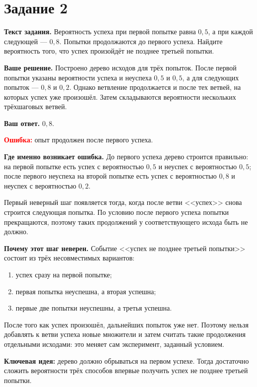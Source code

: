 \documentclass[12pt,a4paper]{article}
\begin{document}
\newpage
{}\label{task:2}
\section*{Задание 2}

\textbf{Текст задания.}
Вероятность успеха при первой попытке равна $0{,}5$, а при каждой следующей --- $0{,}8$. Попытки продолжаются до первого успеха. Найдите вероятность того, что успех произойдёт не позднее третьей попытки.

\textbf{Ваше решение.}
Построено дерево исходов для трёх попыток. После первой попытки указаны вероятности успеха и неуспеха $0{,}5$ и $0{,}5$, а для следующих попыток --- $0{,}8$ и $0{,}2$. Однако ветвление продолжается и после тех ветвей, на которых успех уже произошёл. Затем складываются вероятности нескольких трёхшаговых ветвей.

\textbf{Ваш ответ.} $0{,}8$.

\textcolor{red}{\textbf{Ошибка:}} опыт продолжен после первого успеха.

\textbf{Где именно возникает ошибка.}
До первого успеха дерево строится правильно: на первой попытке есть успех с вероятностью $0{,}5$ и неуспех с вероятностью $0{,}5$; после первого неуспеха на второй попытке есть успех с вероятностью $0{,}8$ и неуспех с вероятностью $0{,}2$.

Первый неверный шаг появляется тогда, когда после ветви <<успех>> снова строится следующая попытка. По условию после первого успеха попытки прекращаются, поэтому таких продолжений у соответствующего исхода быть не должно.

\textbf{Почему этот шаг неверен.}
Событие <<успех не позднее третьей попытки>> состоит из трёх несовместимых вариантов:
\begin{enumerate}
  \item успех сразу на первой попытке;
  \item первая попытка неуспешна, а вторая успешна;
  \item первые две попытки неуспешны, а третья успешна.
\end{enumerate}
После того как успех произошёл, дальнейших попыток уже нет. Поэтому нельзя добавлять к ветви успеха новые множители и затем считать такие продолжения отдельными исходами: это меняет сам эксперимент, заданный условием.

\textcolor{blue!60!black}{\textbf{Ключевая идея:}} дерево должно обрываться на первом успехе. Тогда достаточно сложить вероятности трёх способов впервые получить успех не позднее третьей попытки.
\end{document}
